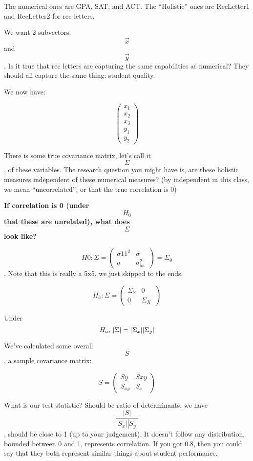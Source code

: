 \documentclass[]{article}
\begin{document}
The numerical ones are GPA, SAT, and ACT. The ``Holistic'' ones are
RecLetter1 and RecLetter2 for rec letters.

We want 2 subvectors, \[\overrightarrow{x}\] and \[\overrightarrow{y}\].
Is it true that rec letters are capturing the same capabilities as
numerical? They should all capture the same thing: student quality.

We now have:

\[\left(\begin{array}{c} x_1 \\ x_2 \\ x_3 \\ y_1 \\ y_2 \end{array} \right)\]

There is some true covariance matrix, let's call it \[\Sigma\], of these
variables. The research question you might have is, are these holistic
measures independent of these numerical measures? (by independent in
this class, we mean ``uncorrelated'', or that the true correlation is 0)

\textbf{If correlation is 0 (under} \[H_0\] \textbf{that these are
unrelated), what does} \[\Sigma\] \textbf{look like?}

\[H0: \Sigma = \left(\begin{array}{c} \sigma{11}^2 & \sigma \\ \sigma & \sigma_{55}^2 \ \end{array} \right) = \Sigma_0\].
Note that this is really a 5x5, we just skipped to the ends.

\[H_a: \Sigma = \left(\begin{array}{c} \Sigma_Y & 0 \\ 0 & \Sigma_X \ \end{array} \right)\]

Under \[H_a$, $| \Sigma | = | \Sigma_x | | \Sigma_y |\]

We've calculated some overall \[S\], a sample covariance matrix:

\[S = \left(\begin{array}{c} Sy & S{xy} \\ S_{xy} & S_x \ \end{array} \right)\]

What is our test statistic? Should be ratio of determinants: we have
\[\frac{| S |}{| S_x | |S_y|}\], should be close to 1 (up to your
judgement). It doesn't follow any distribution, bounded between 0 and 1,
represents correlation. If you got 0.8, then you could say that they
both represent similar things about student performance.
\end{document}
